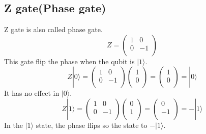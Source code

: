 \subsection*{Z gate(Phase gate)}
Z gate is also called phase gate.
\begin{equation}
    Z =
    \begin{pmatrix}
        1 & 0\\
        0 & -1\\
    \end{pmatrix}
\end{equation}
This gate flip the phase when the qubit is $|1\rangle$.
\begin{equation}
    Z |0\rangle =
    \begin{pmatrix}
        1 & 0\\
        0 & -1\\
    \end{pmatrix}
    \begin{pmatrix}
        1 \\
        0 \\
    \end{pmatrix} = 
    \begin{pmatrix}
        1 \\
        0 \\
    \end{pmatrix} = |0\rangle
\end{equation}
It has no effect in $|0\rangle$.
\begin{equation}
    Z |1\rangle =
    \begin{pmatrix}
        1 & 0\\
        0 & -1\\
    \end{pmatrix}
    \begin{pmatrix}
        0 \\
        1 \\
    \end{pmatrix} = 
    \begin{pmatrix}
        0 \\
        -1 \\
    \end{pmatrix} = -|1\rangle
\end{equation}
In the $|1\rangle$ state, the phase flips so the state to $-|1\rangle$.
